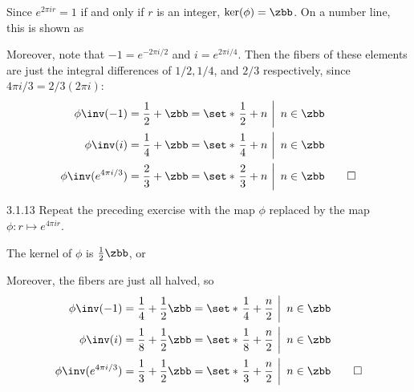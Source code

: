 \begin{sol}
    Since $e^{2\pi ir} = 1$ if and only if $r$ is an integer, $\ker(\phi) = \zbb$.
	On a number line, this is shown as
    \begin{center}
    \end{center}
    Moreover, note that $-1 = e^{-2\pi i/2}$ and $i = e^{2\pi i/4}$.
	Then the fibers of these elements are just the integral differences of $1/2, 1/4$, and $2/3$ respectively, since $4\pi i/3 = 2/3(2\pi i)$:
    \begin{align*}
        \phi\inv(-1) & = \frac 12 + \zbb = \set*{\left.\frac 12 + n~\right|~n \in \zbb} \\
        \phi\inv(i) & = \frac 14 + \zbb = \set*{\left.\frac 14 + n~\right|~n \in \zbb} \\
        \phi\inv(e^{4\pi i/3}) & = \frac 23 + \zbb = \set*{\left.\frac 23 + n~\right|~n \in \zbb} \qedhere
    \end{align*}
\end{sol}

\begin{exercise}{3.1.13}
    Repeat the preceding exercise with the map $\phi$ replaced by the map $\phi \colon r \mapsto e^{4\pi i r}$.
\end{exercise}

\begin{sol}
    The kernel of $\phi$ is $\frac12\zbb$, or
    \begin{center}
    \end{center}
    Moreover, the fibers are just all halved, so
    \begin{align*}
        \phi\inv(-1) & = \frac14 + \frac12 \zbb = \set*{\left.\frac14 + \frac n2~\right|~n \in \zbb} \\
        \phi\inv(i) & = \frac18 + \frac12 \zbb = \set*{\left.\frac18 + \frac n2~\right|~n \in \zbb} \\
        \phi\inv(e^{4\pi i/3}) & = \frac13 + \frac12 \zbb = \set*{\left.\frac13 + \frac n2~\right|~n \in \zbb} \qedhere
    \end{align*}
\end{sol}

